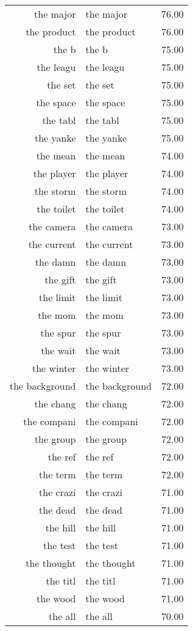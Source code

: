 \begin{table}[ht]
\begin{tabular}{rlr}
  the major & the major & 76.00 \\ 
  the product & the product & 76.00 \\ 
  the b & the b & 75.00 \\ 
  the leagu & the leagu & 75.00 \\ 
  the set & the set & 75.00 \\ 
  the space & the space & 75.00 \\ 
  the tabl & the tabl & 75.00 \\ 
  the yanke & the yanke & 75.00 \\ 
  the mean & the mean & 74.00 \\ 
  the player & the player & 74.00 \\ 
  the storm & the storm & 74.00 \\ 
  the toilet & the toilet & 74.00 \\ 
  the camera & the camera & 73.00 \\ 
  the current & the current & 73.00 \\ 
  the damn & the damn & 73.00 \\ 
  the gift & the gift & 73.00 \\ 
  the limit & the limit & 73.00 \\ 
  the mom & the mom & 73.00 \\ 
  the spur & the spur & 73.00 \\ 
  the wait & the wait & 73.00 \\ 
  the winter & the winter & 73.00 \\ 
  the background & the background & 72.00 \\ 
  the chang & the chang & 72.00 \\ 
  the compani & the compani & 72.00 \\ 
  the group & the group & 72.00 \\ 
  the ref & the ref & 72.00 \\ 
  the term & the term & 72.00 \\ 
  the crazi & the crazi & 71.00 \\ 
  the dead & the dead & 71.00 \\ 
  the hill & the hill & 71.00 \\ 
  the test & the test & 71.00 \\ 
  the thought & the thought & 71.00 \\ 
  the titl & the titl & 71.00 \\ 
  the wood & the wood & 71.00 \\ 
  the all & the all & 70.00 \\ 

\end{tabular}
\end{table}
